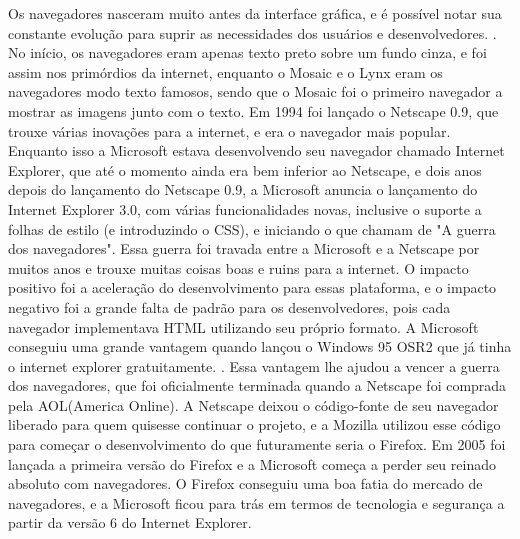 Os navegadores nasceram muito antes da interface gráfica,
e é possível notar sua constante evolução para suprir as necessidades
dos usuários e desenvolvedores. \cite{robbins2006web}. No início, os
navegadores eram apenas texto preto sobre um fundo cinza, e foi assim
nos primórdios da internet, enquanto o Mosaic e o Lynx eram os
navegadores modo texto famosos, sendo que o Mosaic foi o primeiro
navegador a mostrar as imagens junto com o texto.
Em 1994 foi lançado o Netscape 0.9, que
trouxe várias inovações para a internet, e era o navegador mais
popular. Enquanto isso a Microsoft estava desenvolvendo seu navegador
chamado Internet Explorer, que até o momento ainda era bem inferior ao
Netscape, e dois anos depois do lançamento do
Netscape 0.9, a Microsoft anuncia o lançamento do Internet Explorer 3.0, com várias
funcionalidades novas, inclusive o suporte a folhas de estilo (e
introduzindo o CSS), e iniciando o que chamam de "A guerra dos
navegadores". Essa guerra foi travada entre a Microsoft e a Netscape
por muitos anos e trouxe muitas coisas boas e ruins para a internet. O
impacto positivo foi a aceleração do desenvolvimento para essas
plataforma, e o impacto negativo foi a grande falta de padrão para os
desenvolvedores, pois cada navegador implementava HTML utilizando seu
próprio formato. A Microsoft conseguiu uma grande vantagem quando lançou
o Windows 95 OSR2 que já tinha o internet explorer gratuitamente.
\cite{asleson2006foundations}. Essa vantagem lhe ajudou a vencer a guerra
dos navegadores, que foi oficialmente terminada quando a
Netscape foi comprada pela AOL(America Online). A Netscape deixou o código-fonte
de seu navegador liberado para quem quisesse continuar o projeto,
e a Mozilla utilizou esse código para começar o desenvolvimento
do que futuramente seria o Firefox.
Em 2005 foi lançada a primeira versão do Firefox e a Microsoft começa
a perder seu reinado absoluto com navegadores. O Firefox conseguiu uma
boa fatia do mercado de navegadores, e a Microsoft ficou para trás em
termos de tecnologia e segurança a partir da versão 6 do Internet Explorer.

